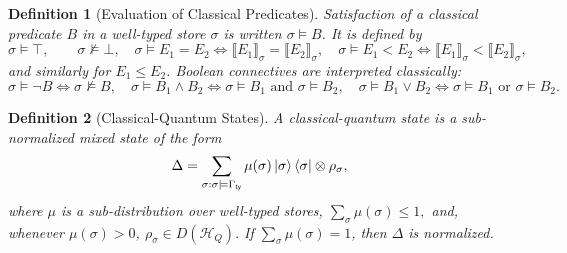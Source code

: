 \documentclass[acmsmall,screen,review,anonymous,nonacm]{acmart}
\newtheorem{definition}{Definition}[section]
\theoremstyle{defn_style}
\begin{document}
\begin{definition}[Evaluation of Classical Predicates]
Satisfaction of a classical predicate \(B\) in a well-typed store \(\sigma\)
is written \(\sigma\models B\). It is defined by
\[
\sigma\models\top,\qquad \sigma\not\models\bot,
\quad
\sigma\models E_1=E_2
\Longleftrightarrow
\llbracket E_1\rrbracket_\sigma=\llbracket E_2\rrbracket_\sigma,
\quad
\sigma\models E_1<E_2
\Longleftrightarrow
\llbracket E_1\rrbracket_\sigma<\llbracket E_2\rrbracket_\sigma,
\]
and similarly for \(E_1\le E_2\). Boolean connectives are interpreted
classically:
\[
\sigma\models\neg B\Longleftrightarrow \sigma\not\models B,
\quad
\sigma\models B_1\land B_2
\Longleftrightarrow
\sigma\models B_1\text{ and }\sigma\models B_2,
\quad
\sigma\models B_1\lor B_2
\Longleftrightarrow
\sigma\models B_1\text{ or }\sigma\models B_2.
\]
\end{definition}

\begin{definition}[Classical-Quantum States]
A classical-quantum state is a sub-normalized mixed state of the form
\[
\Delta
=
\sum_{\sigma:\sigma\models\Gamma_{\mathsf{ty}}}
\mu(\sigma)\ket{\sigma}\bra{\sigma}\otimes\rho_\sigma,
\]
where \(\mu\) is a sub-distribution over well-typed stores,
\(\sum_{\sigma}\mu(\sigma)\le 1,\)
and, whenever \(\mu(\sigma)>0\),
\(\rho_\sigma\in D(\mathcal H_Q).\)
If \(\sum_\sigma\mu(\sigma)=1\), then \(\Delta\) is normalized.
\end{definition}
\end{document}
